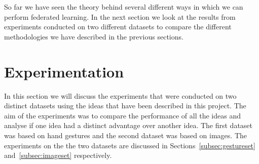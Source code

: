 \documentclass[12pt]{article}
\begin{document}
\\\\
So far we have seen the theory behind several different ways in which we can perform federated learning. In the next section we look at the results from experiments conducted on two different datasets to compare the different methodologies we have described in the previous sections.
\clearpage

\section{Experimentation}\label{sec:experiments}
In this section we will discuss the experiments that were conducted on two distinct datasets using the ideas that have been described in this project. The aim of the experiments was to compare the performance of all the ideas and analyse if one idea had a distinct advantage over another idea. The first dataset was based on hand gestures and the second dataset was based on images. The experiments on the the two datasets are discussed in Sections~\ref{subsec:gestureset} and~\ref{subsec:imageset} respectively.
\\\\
\end{document}
